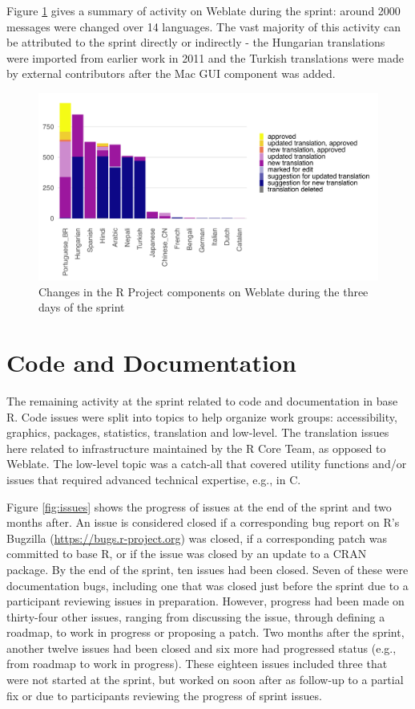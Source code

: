 Figure \ref{fig:translation} gives a summary of activity on Weblate during
the sprint: around 2000 messages were changed over 14 languages. The
vast majority of this activity can be attributed to the sprint
directly or indirectly - the Hungarian translations were imported from earlier
work in 2011 and the Turkish translations were made by external contributors
after the Mac GUI component was added.

\begin{figure}
\includegraphics[width=1\linewidth]{figures/translations} \caption{Changes in the R Project components on Weblate during the three days of the sprint}\label{fig:translation}
\end{figure}

\hypertarget{code-and-documentation}{%
\section{Code and Documentation}\label{code-and-documentation}}

The remaining activity at the sprint related to code and documentation in base R.
Code issues were split into topics to help organize work groups:
accessibility, graphics, packages, statistics, translation and low-level. The
translation issues here related to infrastructure maintained by the R Core Team, as opposed to Weblate. The low-level topic was a catch-all that covered utility
functions and/or issues that required advanced technical expertise, e.g., in C.

Figure \ref{fig:issues} shows the progress of issues at the end of the sprint
and two months after. An issue is considered closed if a corresponding bug report on R's Bugzilla (\url{https://bugs.r-project.org}) was closed, if a corresponding patch was committed to base R, or if the issue was closed by an update to a CRAN package. By the end of the sprint, ten issues had been closed. Seven of these were documentation bugs, including one that was closed just before the sprint due to a participant reviewing issues in preparation. However, progress had been made on thirty-four other issues, ranging from discussing the issue, through defining a roadmap, to work in progress or proposing a patch. Two months after the sprint, another twelve issues had been closed and six more had progressed status (e.g., from roadmap to work in progress). These eighteen issues included three that were not started at the sprint, but worked on soon after as follow-up to a partial fix or due to participants reviewing the progress of sprint issues.

